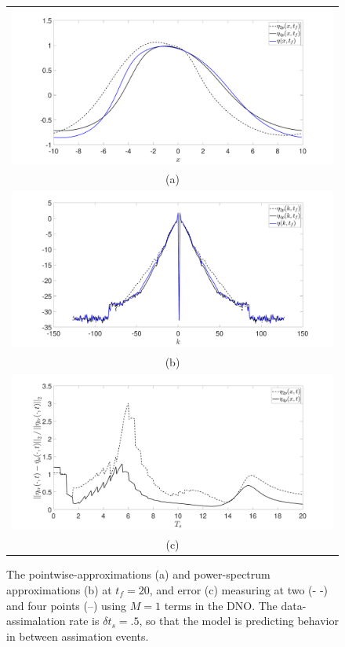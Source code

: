 \begin{figure}[!h]
	\begin{tabular}{c}
		\includegraphics[width=.8\textwidth]{./Images/pwise_sig_pt1_srate_pt5_Nens_200_Np_4_tf_20_M_1}\\
		(a)\\
		\includegraphics[width=.8\textwidth]{./Images/pspec_sig_pt1_srate_pt5_Nens_200_Np_4_tf_20_M_1}\\
		(b)\\
		\includegraphics[width=.8\textwidth]{./Images/error_sig_pt1_srate_pt5_Nens_200_Np_4_tf_20_M_1}\\
		(c)	
	\end{tabular}	
	\caption{The pointwise-approximations (a) and power-spectrum approximations (b) at $t_{f}=20$, and error (c) measuring at two (- -) and four points (--) using $M=1$ terms in the DNO.  The data-assimalation rate is $\delta t_{s}=.5$, so that the model is predicting behavior in between assimation events.}
	\label{fig:dno_1}
\end{figure}

